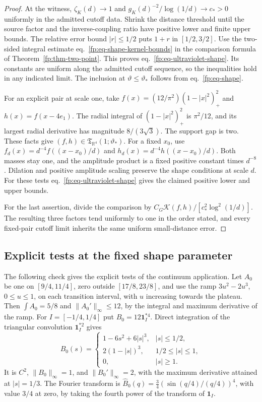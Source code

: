 \documentclass[11pt,letterpaper,reqno]{amsart}
\numberwithin{equation}{section}
\renewcommand{\eqref}[1]{\textup{eq.~\ref{#1}}}
\theoremstyle{definition}
\theoremstyle{remark}
\begin{document}
\begin{proof}
At the witness, \(\zeta_K(d)\to1\) and
\(g_K(d)^{-2}/\log(1/d)\to c_*>0\) uniformly in the admitted
cutoff data. Shrink the distance threshold until the source
factor and the inverse-coupling ratio have positive lower
and finite upper bounds. The relative error bound
\(|r|\le1/2\) puts \(1+r\) in \([1/2,3/2]\).
Use the two-sided integral estimate
\eqref{fp:eq-shape-kernel-bounds} in the comparison formula of
Theorem~\ref{fp:thm-two-point}. This proves
\eqref{fp:eq-ultraviolet-shape}. Its constants are uniform
along the admitted cutoff sequence, so the inequalities
hold in any indicated limit. The inclusion at
\(\vartheta\le\vartheta_*\) follows from \eqref{fp:eq-shape}.

For an explicit pair at scale one, take
\(f(x)=(12/\pi^2)(1-|x|^2)_+^2\) and \(h(x)=f(x-4e_1)\).
The radial integral of \((1-|x|^2)_+^2\) is \(\pi^2/12\),
and its largest radial derivative has magnitude \(8/(3\sqrt3)\).
The support gap is two. These facts give
\((f,h)\in\mathfrak T_{\mathbb R^4}(1;\vartheta_*)\).
For a fixed \(x_0\), use
\(f_d(x)=d^{-4}f((x-x_0)/d)\) and
\(h_d(x)=d^{-4}h((x-x_0)/d)\).
Both masses stay one, and the amplitude product is a fixed
positive constant times \(d^{-8}\). Dilation and positive
amplitude scaling preserve the shape conditions at scale \(d\).
For these tests \eqref{fp:eq-ultraviolet-shape} gives the
claimed positive lower and upper bounds.

For the last assertion, divide
the comparison by \(C_G\mathcal K(f,h)/[c_*^2\log^2(1/d)]\).
The resulting three factors tend uniformly to one in the
order stated, and every fixed-pair cutoff limit inherits
the same uniform small-distance error.
\end{proof}

\subsection{Explicit tests at the fixed shape parameter}
The following check gives the explicit tests of the continuum application.
Let \(A_0\) be one on \([9/4,11/4]\), zero outside \([17/8,23/8]\),
and use the ramp \(3u^2-2u^3\), \(0\le u\le1\), on each transition
interval, with \(u\) increasing towards the plateau. Then
\(\int A_0=5/8\) and \(\|A_0'\|_\infty\le12\), by the integral
and maximum derivative of the ramp. For \(I=[-1/4,1/4]\) put
\(B_0=12\mathbf1_I^{*4}\). Direct integration of the triangular
convolution \(\mathbf1_I^{*2}\) gives
\[
 B_0(s)=
 \begin{cases}
  1-6s^2+6|s|^3,& |s|\le1/2,\\
  2(1-|s|)^3,&1/2\le|s|\le1,\\
  0,&|s|\ge1.
 \end{cases}
\]
It is \(C^2\), \(\|B_0\|_\infty=1\), and
\(\|B_0'\|_\infty=2\), with the maximum derivative attained at
\(|s|=1/3\). The Fourier transform is
\(\widehat B_0(q)=\tfrac34(\sin(q/4)/(q/4))^4\), with value
\(3/4\) at zero, by taking the fourth power of the transform of
\(\mathbf1_I\).
\end{document}
